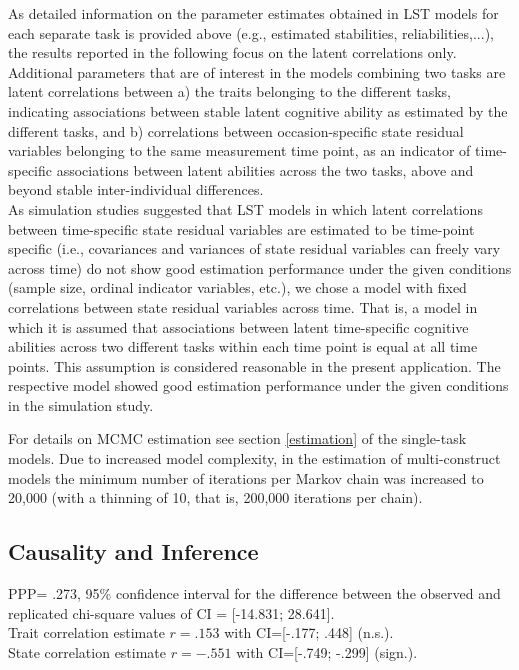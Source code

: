 As detailed information on the parameter estimates obtained in LST models for each separate task is provided above (e.g., estimated stabilities, reliabilities,...), the results reported in the following focus on the latent correlations only.  Additional parameters that are of interest in the models combining two tasks are latent correlations between a) the traits belonging to the different tasks, indicating associations between stable latent cognitive ability as estimated by the different tasks, and b) correlations between occasion-specific state residual variables belonging to the same measurement time point, as an indicator of time-specific associations between latent abilities across the two tasks, above and beyond stable inter-individual differences. \\

As simulation studies suggested that LST models in which latent correlations between time-specific state residual variables are estimated to be time-point specific (i.e., covariances and variances of state residual variables can freely vary across time) do not show good estimation performance under the given conditions (sample size, ordinal indicator variables, etc.), we chose a model with fixed correlations between state residual variables across time. That is, a model in which it is assumed that associations between latent time-specific cognitive abilities across two different tasks within each time point is equal at all time points. This assumption is considered reasonable in the present application. The respective model showed good estimation performance under the given conditions in the simulation study.

 For details on MCMC estimation see section \ref{estimation} of the single-task models. Due to increased model complexity, in the estimation of multi-construct models the minimum number of iterations per Markov chain was increased to 20,000 (with a thinning of 10, that is, 200,000 iterations per chain). 

\subsection{Causality and Inference}

PPP= .273, 95\% confidence interval for the difference between the observed and replicated chi-square values of CI = [-14.831; 28.641]. \\
Trait correlation estimate $r=.153$ with CI=[-.177; .448] (n.s.).  \\
State correlation estimate $r=-.551$ with CI=[-.749; -.299] (sign.).\\

